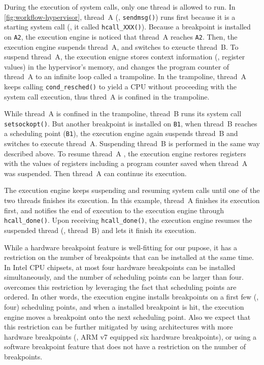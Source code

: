 

During the execution of system calls, only one thread is allowed to
run. In \autoref{fig:workflow-hypervisor}, thread~A (\ie,
\texttt{sendmsg()}) runs first because it is a starting system
call (\ie, it called \texttt{hcall_XXX()}).
%
Because a breakpoint is installed on \texttt{A2}, the execution engine
is noticed that thread~A reaches \texttt{A2}.
%
Then, the execution engine suspends thread~A, and switches to exeucte
thread~B.
%
To suspend thread~A, the execution enigne stores context information
(\eg, register values) in the hypervisor's memory, and changes the
program counter of thread~A to an infinite loop called a trampoline.
%
In the trampoline, thread~A keeps calling \texttt{cond_resched()} to
yield a CPU without proceeding with the system call execution, thus
thred~A is confined in the trampoline.
%



While thread~A is confined in the trampoline, thread~B runs its system
call \texttt{setsockopt()}.
%
But another breakpoint is installed on \texttt{B1}, when thread~B
reaches a scheduling point (\texttt{B1}), the execution engine again
suspends thread~B and switches to execute thread~A.
%
Suspending thread~B is performed in the same way described above.
%
To resume thread~A , the execution engine restores registers with the
values of registers including a program counter saved when thread~A
was suspended. Then thread~A can continue its execution.


The execution engine keeps suspending and resuming system calls until
one of the two threads finishes its execution. In this example,
thread~A finishes its execution first, and notifies the end of
execution to the execution engine through \texttt{hcall_done()}.
%
Upon receiving \texttt{hcall_done()}, the execution engine resumes the
suspended thread (\ie, thread~B) and lets it finish its execution.




%
While a hardware breakpoint feature is well-fitting for our pupose, it
has a restriction on the number of breakpoints that can be installed
at the same time.
%
In Intel CPU chipsets, at most four hardware breakpoints can be
installed simultaneously, and the number of scheduling points can be
larger than four.
%
\sys overcomes this restriction by leveraging the fact that
scheduling points are ordered. In other words, the execution engine
installs breakpoints on a first few (\eg, four) scheduling points,
and when a installed breakpoint is hit, the execution engine moves a
breakpoint onto the next scheduling point.
%
Also we expect that this restriction can be further mitigated by using
architectures with more hardware breakpoints (\eg, ARM v7 equipped six
hardware breakpoints), or using a software breakpoint feature that
does not have a restriction on the number of breakpoints.



